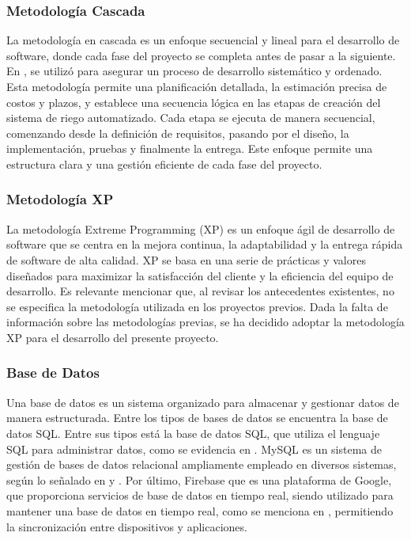 \subsubsection*{Metodología Cascada}
La metodología en cascada es un enfoque secuencial y lineal para el desarrollo de software, donde cada fase del proyecto se completa antes de pasar a la siguiente. En \cite{alcivar_dominguez_sistema_2018}, se utilizó para asegurar un proceso de desarrollo sistemático y ordenado. Esta metodología permite una planificación detallada, la estimación precisa de costos y plazos, y establece una secuencia lógica en las etapas de creación del sistema de riego automatizado. Cada etapa se ejecuta de manera secuencial, comenzando desde la definición de requisitos, pasando por el diseño, la implementación, pruebas y finalmente la entrega. Este enfoque permite una estructura clara y una gestión eficiente de cada fase del proyecto.

\subsubsection*{Metodología XP}
La metodología Extreme Programming (XP) es un enfoque ágil de desarrollo de software que se centra en la mejora continua, la adaptabilidad y la entrega rápida de software de alta calidad. XP se basa en una serie de prácticas y valores diseñados para maximizar la satisfacción del cliente y la eficiencia del equipo de desarrollo. Es relevante mencionar que, al revisar los antecedentes existentes, no se especifica la metodología utilizada en los proyectos previos. Dada la falta de información sobre las metodologías previas, se ha decidido adoptar la metodología XP para el desarrollo del presente proyecto.

\subsubsection*{Base de Datos}
Una base de datos es un sistema organizado para almacenar y gestionar datos de manera estructurada. Entre los tipos de bases de datos se encuentra la base de datos SQL. Entre sus tipos está la base de datos SQL, que utiliza el lenguaje SQL para administrar datos, como se evidencia en \cite{al-ali_iot-solar_2019}. MySQL es un sistema de gestión de bases de datos relacional ampliamente empleado en diversos sistemas, según lo señalado en \cite{alcivar_dominguez_sistema_2018} y \cite{castillo_herrero_desarrollo_2020}. Por último, Firebase que es una plataforma de Google, que proporciona servicios de base de datos en tiempo real, siendo utilizado para mantener una base de datos en tiempo real, como se menciona en \cite{ramos_galindo_diseno_2023}, permitiendo la sincronización entre dispositivos y aplicaciones.

